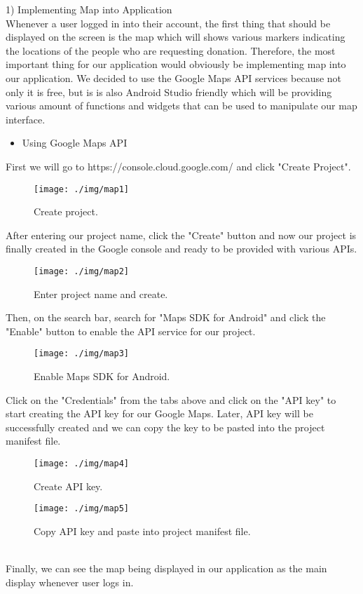 \documentclass[conference]{IEEEtran}
\begin{document}
1) Implementing Map into Application\\

Whenever a user logged in into their account, the first thing that should be displayed on the screen is the map which will shows various markers indicating the locations of the people who are requesting donation. Therefore, the most important thing for our application would obviously be implementing map into our application. We decided to use the Google Maps API services because not only it is free, but is is also Android Studio friendly which will be providing various amount of functions and widgets that can be used to manipulate our map interface.\\

\begin{itemize}
\item Using Google Maps API
\end{itemize}
First we will go to https://console.cloud.google.com/ and click "Create Project".

\begin{figure}[h!]
\texttt{[image: ./img/map1]}
\centering
\caption{Create project.}
\end{figure}
After entering our project name, click the "Create" button and now our project is finally created in the Google console and ready to be provided with various APIs.\\
\begin{figure}[h!]
\texttt{[image: ./img/map2]}
\centering
\caption{Enter project name and create.}
\end{figure}
Then, on the search bar, search for "Maps SDK for Android" and click the "Enable" button to enable the API service for our project.
\begin{figure}[h!]
\texttt{[image: ./img/map3]}
\centering
\caption{Enable Maps SDK for Android.}
\end{figure}
Click on the "Credentials" from the tabs above and click on the "API key" to start creating the API key for our Google Maps. Later, API key will be successfully created and we can copy the key to be pasted into the project manifest file.
\begin{figure}[h!]
\texttt{[image: ./img/map4]}
\centering
\caption{Create API key.}
\end{figure}
\begin{figure}[h!]
\texttt{[image: ./img/map5]}
\centering
\caption{Copy API key and paste into project manifest file.}
\end{figure}
\\Finally, we can see the map being displayed in our application as the main display whenever user logs in.
\end{document}
